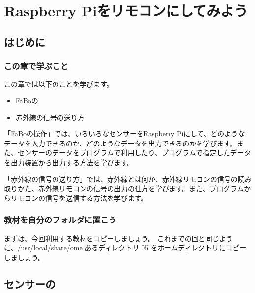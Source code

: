 \documentclass[text05.tex]{subfiles}
\begin{document}
\chapter{Raspberry Piをリモコンにしてみよう}
\section{はじめに}
\subsection{この章で学ぶこと}

この章では以下のことを学びます。
\begin{itemize}
\item FaBoの
\item 赤外線の信号の送り方
\end{itemize}

「FaBoの操作」では、いろいろなセンサーをRaspberry Piにして、どのようなデータを入力できるのか、どのようなデータを出力できるのかを学びます。また、センサーのデータをプログラムで利用したり、プログラムで指定したデータを出力装置から出力する方法を学びます。

「赤外線の信号の送り方」では、赤外線とは何か、赤外線リモコンの信号の読み取りかた、赤外線リモコンの信号の出力の仕方を学びます。また、プログラムからリモコンの信号を送信する方法を学びます。

\subsection{教材を自分のフォルダに置こう}
まずは、今回利用する教材をコピーしましょう。
これまでの回と同じように、\nobreak/usr/local/share/ome あるディレクトリ 05 をホームディレクトリにコピーしましょう。

\newpage
\section{センサーの}
\end{document}
